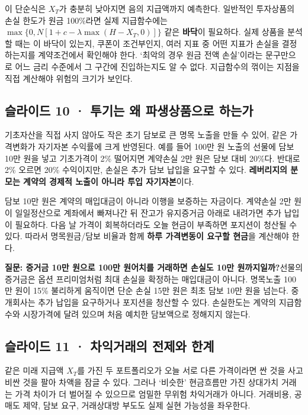 \documentclass[11pt,a4paper]{article}
\begin{document}
이 단순식은 $X_T$가 충분히 낮아지면 음의 지급액까지 예측한다. 일반적인 투자상품의 손실 한도가 원금 100\%라면 실제 지급함수에는 $\max\{0,N[1+c-\lambda\max(H-X_T,0)]\}$ 같은 \textbf{바닥}이 필요하다. 실제 상품을 분석할 때는 이 바닥이 있는지, 쿠폰이 조건부인지, 여러 지표 중 어떤 지표가 손실을 결정하는지를 계약조건에서 확인해야 한다. ‘최악의 경우 원금 전액 손실’이라는 문구만으로 어느 금리 수준에서 그 구간에 진입하는지도 알 수 없다. 지급함수의 꺾이는 지점을 직접 계산해야 위험의 크기가 보인다.\par

\subsection{슬라이드 10 · 투기는 왜 파생상품으로 하는가}
기초자산을 직접 사지 않아도 작은 초기 담보로 큰 명목 노출을 만들 수 있어, 같은 가격변화가 자기자본 수익률에 크게 반영된다. 예를 들어 100만 원 노출의 선물에 담보 10만 원을 넣고 기초가격이 2\% 떨어지면 계약손실 2만 원은 담보 대비 20\%다. 반대로 2\% 오르면 20\% 수익이지만, 손실은 추가 담보 납입을 요구할 수 있다. \textbf{레버리지의 분모는 계약의 경제적 노출이 아니라 투입 자기자본}이다.\par

담보 10만 원은 계약의 매입대금이 아니라 이행을 보증하는 자금이다. 계약손실 2만 원이 일일정산으로 계좌에서 빠져나간 뒤 잔고가 유지증거금 아래로 내려가면 추가 납입이 필요하다. 다음 날 가격이 회복하더라도 오늘 현금이 부족하면 포지션이 청산될 수 있다. 따라서 명목원금/담보 비율과 함께 \textbf{하루 가격변동이 요구할 현금}을 계산해야 한다.\par

\par\medskip\noindent\textbf{질문: 증거금 10만 원으로 100만 원어치를 거래하면 손실도 10만 원까지일까?}\quad 선물의 증거금은 옵션 프리미엄처럼 최대 손실을 확정하는 매입대금이 아니다. 명목노출 100만 원이 15\% 불리하게 움직이면 단순 손실 15만 원은 최초 담보 10만 원을 넘는다. 중개회사는 추가 납입을 요구하거나 포지션을 청산할 수 있다. 손실한도는 계약의 지급함수와 시장가격에 달려 있으며 처음 예치한 담보액으로 정해지지 않는다.\par

\subsection{슬라이드 11 · 차익거래의 전제와 한계}
같은 미래 지급액 $X_T$를 가진 두 포트폴리오가 오늘 서로 다른 가격이라면 싼 것을 사고 비싼 것을 팔아 차액을 잠글 수 있다. 그러나 ‘비슷한’ 현금흐름만 가진 상대가치 거래는 가격 차이가 더 벌어질 수 있으므로 엄밀한 무위험 차익거래가 아니다. 거래비용, 공매도 제약, 담보 요구, 거래상대방 부도도 실제 실현 가능성을 좌우한다.\par
\end{document}
